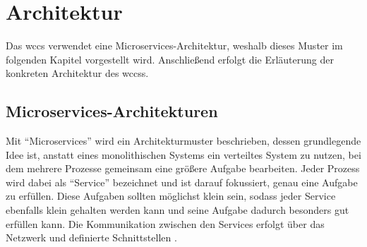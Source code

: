 \section{Architektur}
    \label{section:Architecture}
    Das \gls{wccs} verwendet eine Microservices-Architektur,
    weshalb dieses Muster im folgenden Kapitel vorgestellt wird.
    Anschließend erfolgt die Erläuterung der konkreten Architektur des \glspl{wccs}.

    \subsection{Microservices-Architekturen}
        \label{section:conceptMicroServices}
        Mit "`Microservices"' wird ein Architekturmuster beschrieben,
        dessen grundlegende Idee ist, anstatt eines monolithischen Systems
        ein verteiltes System zu nutzen, bei dem mehrere Prozesse gemeinsam
        eine größere Aufgabe bearbeiten.
        Jeder Prozess wird dabei als "`Service"' bezeichnet und ist darauf
        fokussiert, genau eine Aufgabe zu erfüllen.
        Diese Aufgaben sollten möglichst klein sein,
        sodass jeder Service ebenfalls klein gehalten werden kann und seine
        Aufgabe dadurch besonders gut erfüllen kann.
        Die Kommunikation zwischen den Services erfolgt über das Netzwerk
        und definierte Schnittstellen
        \cite[Kapitel 1.1]{newman:microservices}.

